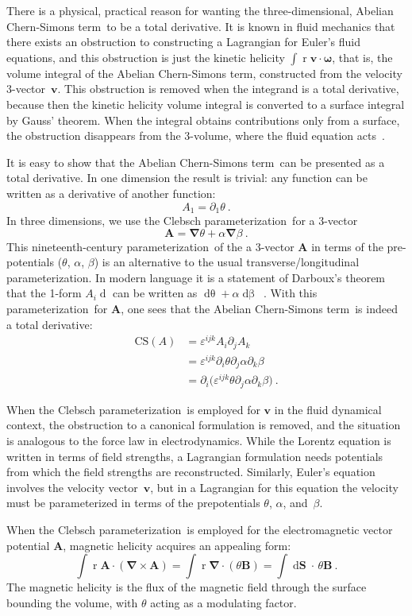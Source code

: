 \documentclass[a4paper,12pt,twoside]{article}
\newcommand{\rd}[1]{\mathop{\mathrm{d}#1}}
\newcommand{\grad}{\vec\nabla}
\newcommand{\CSt}{Chern-Simons term}
\newcommand{\Cpr}{Clebsch pa\-ra\-me\-ter\-iza\-tion}
\newcommand{\pr}{para\-me\-ter\-iza\-tion}
\newcommand{\pp}[1]{\partial_{#1}}
\newcommand{\numeq}[2]{\begin{equation}
#2
\label{#1}
\end{equation}}
\let\vec\boldsymbol
\let\eps\varepsilon
\begin{document}
There is a physical, practical reason for wanting the three-dimensional, Abelian \CSt\ 
to be a total derivative. It is known in fluid mechanics that there exists an
obstruction to constructing a Lagrangian for Euler's fluid equations, and this
obstruction is just the kinetic helicity  \hbox{$\int \rd{^3 r} \vec v\cdot
\vec\omega$}, that is, the volume integral of the Abelian \CSt, constructed from the
velocity 3-vector~$\vec v$. This obstruction is removed when the integrand is a total
derivative, because then the kinetic helicity volume integral is converted to a surface
integral by Gauss' theorem. When the integral obtains contributions only from a
surface,  the obstruction disappears from the 3-volume, where the fluid equation
acts~\cite{ref10}. 

It is easy to show that the  Abelian \CSt\ can be presented as a total derivative. In
one dimension the result is trivial: any function can be written as a derivative of
another function:
$$
A_1 = \pp1 \theta \ .
$$
In three dimensions, we use the \Cpr\ for  a 3-vector~\cite{ref11}
\numeq{eq10}{
\vec A = \grad\theta + \alpha\grad\beta\ .
}
This nineteenth-century \pr\ of the a 3-vector $\vec A$ in terms of the
pre-potentials ($\theta$, $\alpha$, $\beta$) is an alternative to the usual
transverse/longitudinal
\pr. In modern language it is a statement of Darboux's
theorem that the 1-form $A_i \rd{x^i}$ can be written as $\rd \theta + \alpha
\rd\beta$~\cite{ref12}. With this
\pr\ for $\vec A$, one sees that the Abelian \CSt\ is indeed a total derivative:
\begin{align}
\mathrm{CS}(A) &= \eps^{ijk} A_i \pp j A_k\label{eq11}\\
&=  \eps^{ijk} \pp i \theta\pp j \alpha \pp k \beta\nonumber\\
&= \pp i \bigl( \eps^{ijk} \theta\pp j \alpha \pp k \beta\bigr)\ .\nonumber
\end{align}

When the \Cpr\ is employed for $\vec v$ in the fluid dynamical context, the
obstruction to a canonical formulation is removed, and the situation is analogous to
the force law in electrodynamics. While the Lorentz equation is written in terms of
field strengths, a Lagrangian formulation needs potentials from which the field
strengths are reconstructed. Similarly, Euler's equation involves the velocity
vector~$\vec v$, but in a Lagrangian for this equation the velocity must be
parameterized in terms of the  prepotentials
$\theta$, $\alpha$, and~$\beta$. 

When the \Cpr\ is employed for the electromagnetic vector potential $\vec A$,
magnetic helicity acquires an appealing form:
\numeq{eq12}{
\int \rd{^3 r} \vec A\cdot (\grad \times \vec A) = 
\int \rd{^3 r} \grad \cdot (\theta\vec B) = \int \rd{\vec S} \cdot\, \theta\vec B\ . 
}
The magnetic helicity is the flux of the magnetic field through the surface bounding
the volume, with  $\theta$ acting as a modulating factor.
\end{document}
